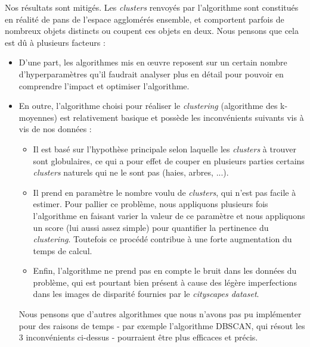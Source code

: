 \documentclass[titlepage,11pt,a4paper]{article}
\begin{document}
\par Nos résultats sont mitigés. Les \emph{clusters} renvoyés par l'algorithme sont constitués en réalité de pans de l'espace agglomérés ensemble, et comportent parfois de nombreux objets distincts ou coupent ces objets en deux. Nous pensons que cela est dû à plusieurs facteurs : 
\begin{itemize}
\item D'une part, les algorithmes mis en œuvre reposent sur un certain nombre d'hyperparamètres qu'il faudrait analyser plus en détail pour pouvoir en comprendre l'impact et optimiser l'algorithme.
\item En outre, l'algorithme choisi pour réaliser le \emph{clustering} (algorithme des k-moyennes) est relativement basique et possède les inconvénients suivants vis à vis de nos données : 
	\begin{itemize}
	\item Il est basé sur l'hypothèse principale selon laquelle les \emph{clusters} à trouver sont globulaires, ce qui a pour effet de couper en plusieurs parties certains \emph{clusters} naturels qui ne le sont pas (haies, arbres, ...).
	\item Il prend en paramètre le nombre voulu de \emph{clusters}, qui n'est pas facile à estimer. Pour pallier ce problème, nous appliquons plusieurs fois l'algorithme en faisant varier la valeur de ce paramètre et nous appliquons un score (lui aussi assez simple) pour quantifier la pertinence du \emph{clustering}. Toutefois ce procédé contribue à une forte augmentation du temps de calcul.
	\item Enfin, l'algorithme ne prend pas en compte le bruit dans les données du problème, qui est pourtant bien présent à cause des légère imperfections dans les images de disparité fournies par le \emph{cityscapes dataset}. 
	\end{itemize}
	Nous pensons que d'autres algorithmes que nous n'avons pas pu implémenter pour des raisons de temps - par exemple l'algorithme DBSCAN, qui résout les 3 inconvénients ci-dessus - pourraient être plus efficaces et précis.
\end{itemize}
\end{document}

